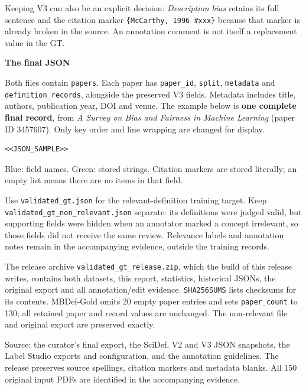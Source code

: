 \documentclass[10pt,a4paper]{article}
\newcommand{\file}[1]{{\small\texttt{#1}}}
\newcommand{\smallhead}[1]{\vspace{7pt}{\large\bfseries #1}\par\vspace{2pt}}
\begin{document}
Keeping V3 can also be an explicit decision: \emph{Description bias} retains its
full sentence and the citation marker \file{\{McCarthy, 1996 \#xxx\}} because that
marker is already broken in the source. An annotation comment is not itself a
replacement value in the GT.

\newpage
{\Large\bfseries The final JSON}\par
Both files contain \file{papers}. Each paper has \file{paper\_id}, \file{split},
\file{metadata} and \file{definition\_records}, alongside the preserved V3 fields.
Metadata includes title, authors, publication year, DOI and venue.
The example below is \textbf{one complete final record}, from
\emph{A Survey on Bias and Fairness in Machine Learning} (paper ID 3457607).
Only key order and line wrapping are changed for display.
\begin{lstlisting}
<<JSON_SAMPLE>>
\end{lstlisting}
{\footnotesize \textcolor{inkblue}{Blue: field names.}
\textcolor{added}{Green: stored strings.} Citation markers are stored literally;
an empty list means there are no items in that field.}

\smallhead{What to use and what to keep}
Use \file{validated\_gt.json} for the relevant-definition training target.
Keep \file{validated\_gt\_non\_relevant.json} separate:
its definitions were judged valid, but supporting fields were hidden when an
annotator marked a concept irrelevant, so those fields did not receive the same
review. Relevance labels and annotation notes remain in the accompanying evidence,
outside the training records.

The release archive \file{validated\_gt\_release.zip}, which the build of this release writes,
contains both datasets, this report, statistics, historical JSONs, the original export and all
annotation/edit evidence. \file{SHA256SUMS} lists checksums for its contents. MBDef-Gold omits 20 empty paper
entries and sets \file{paper\_count} to 130; all retained paper and record values are
unchanged. The non-relevant file and original export are preserved exactly.

{\footnotesize Source: the curator's final export, the SciDef, V2 and V3 JSON snapshots,
the Label Studio exports and configuration, and the annotation guidelines.
The release preserves source spellings, citation markers and metadata blanks.
All 150 original input PDFs are identified in the accompanying evidence.}
\end{document}
